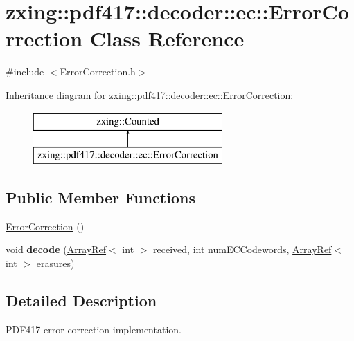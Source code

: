 \hypertarget{classzxing_1_1pdf417_1_1decoder_1_1ec_1_1_error_correction}{}\section{zxing\+:\+:pdf417\+:\+:decoder\+:\+:ec\+:\+:Error\+Correction Class Reference}
\label{classzxing_1_1pdf417_1_1decoder_1_1ec_1_1_error_correction}


{\ttfamily \#include $<$Error\+Correction.\+h$>$}

Inheritance diagram for zxing\+:\+:pdf417\+:\+:decoder\+:\+:ec\+:\+:Error\+Correction\+:\begin{figure}[H]
\begin{center}
\leavevmode
\includegraphics[height=2.000000cm]{classzxing_1_1pdf417_1_1decoder_1_1ec_1_1_error_correction}
\end{center}
\end{figure}
\subsection*{Public Member Functions}
\begin{DoxyCompactItemize}
\item 
\mbox{\hyperlink{classzxing_1_1pdf417_1_1decoder_1_1ec_1_1_error_correction_ac9823bc68404accf4279fe6173958bb8}{Error\+Correction}} ()
\item 
\mbox{\label{classzxing_1_1pdf417_1_1decoder_1_1ec_1_1_error_correction_a34701eb0d5a2cf489b830eb81254d704}} 
void {\bfseries decode} (\mbox{\hyperlink{classzxing_1_1_array_ref}{Array\+Ref}}$<$ int $>$ received, int num\+E\+C\+Codewords, \mbox{\hyperlink{classzxing_1_1_array_ref}{Array\+Ref}}$<$ int $>$ erasures)
\end{DoxyCompactItemize}


\subsection{Detailed Description}
P\+D\+F417 error correction implementation.

